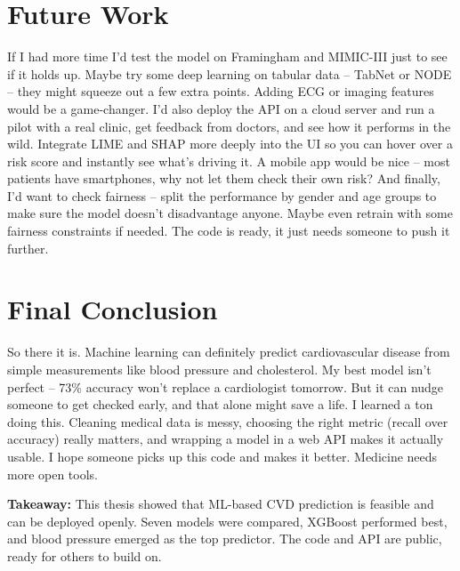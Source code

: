 \documentclass[12pt, a4paper, oneside]{book}
\begin{document}
\section{Future Work}
If I had more time I'd test the model on Framingham and MIMIC-III just to see if it holds up. Maybe try some deep learning on tabular data -- TabNet or NODE -- they might squeeze out a few extra points. Adding ECG or imaging features would be a game-changer. I'd also deploy the API on a cloud server and run a pilot with a real clinic, get feedback from doctors, and see how it performs in the wild. Integrate LIME and SHAP more deeply into the UI so you can hover over a risk score and instantly see what's driving it. A mobile app would be nice -- most patients have smartphones, why not let them check their own risk? And finally, I'd want to check fairness -- split the performance by gender and age groups to make sure the model doesn't disadvantage anyone. Maybe even retrain with some fairness constraints if needed. The code is ready, it just needs someone to push it further.

\section{Final Conclusion}
So there it is. Machine learning can definitely predict cardiovascular disease from simple measurements like blood pressure and cholesterol. My best model isn't perfect -- 73\% accuracy won't replace a cardiologist tomorrow. But it can nudge someone to get checked early, and that alone might save a life. I learned a ton doing this. Cleaning medical data is messy, choosing the right metric (recall over accuracy) really matters, and wrapping a model in a web API makes it actually usable. I hope someone picks up this code and makes it better. Medicine needs more open tools.

\begin{takeaway}
\textbf{Takeaway:} This thesis showed that ML-based CVD prediction is feasible and can be deployed openly. Seven models were compared, XGBoost performed best, and blood pressure emerged as the top predictor. The code and API are public, ready for others to build on.
\end{takeaway}
\end{document}
